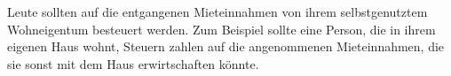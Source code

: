 Leute sollten auf die entgangenen Mieteinnahmen von ihrem selbstgenutztem Wohneigentum besteuert werden.
Zum Beispiel sollte eine Person, die in ihrem eigenen Haus wohnt, Steuern zahlen auf die angenommenen Mieteinnahmen, die sie sonst mit dem Haus erwirtschaften könnte.